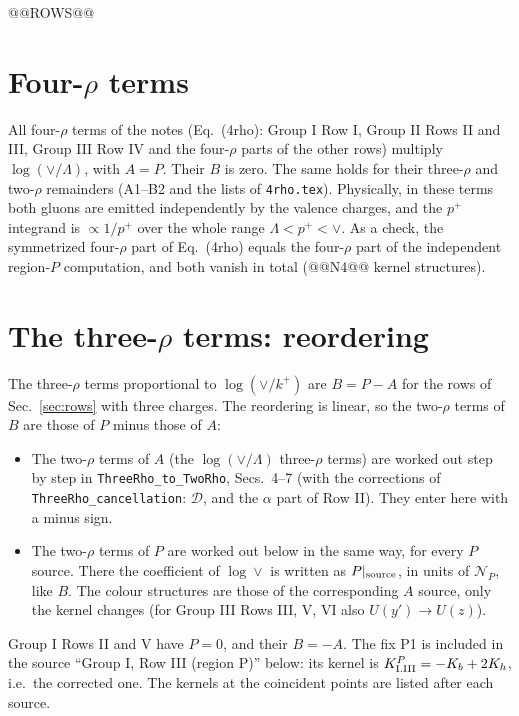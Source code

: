 \documentclass[10pt]{article}
\numberwithin{equation}{section}
\newcommand{\NP}{\mathcal N_{P}}
\newcommand{\pp}{p^+}
\begin{document}
@@ROWS@@

\section{Four-\texorpdfstring{$\rho$}{rho} terms}\label{sec:four}
All four-$\rho$ terms of the notes (Eq.~(4rho): Group I Row I, Group II Rows II and III, Group III Row IV and the four-$\rho$ parts of the other rows) multiply $\log(\vee/\Lambda)$, with $A=P$. Their $B$ is zero. The same holds for their three-$\rho$ and two-$\rho$ remainders (A1--B2 and the lists of \texttt{4rho.tex}). Physically, in these terms both gluons are emitted independently by the valence charges, and the $\pp$ integrand is $\propto1/\pp$ over the whole range $\Lambda<\pp<\vee$. As a check, the symmetrized four-$\rho$ part of Eq.~(4rho) equals the four-$\rho$ part of the independent region-$P$ computation, and both vanish in total (@@N4@@ kernel structures).

\section{The three-\texorpdfstring{$\rho$}{rho} terms: reordering}\label{sec:reorder}
The three-$\rho$ terms proportional to $\log(\vee/k^+)$ are $B=P-A$ for the rows of Sec.~\ref{sec:rows} with three charges. The reordering is linear, so the two-$\rho$ terms of $B$ are those of $P$ minus those of $A$:
\begin{itemize}
\item The two-$\rho$ terms of $A$ (the $\log(\vee/\Lambda)$ three-$\rho$ terms) are worked out step by step in \texttt{ThreeRho\_to\_TwoRho}, Secs.~4--7 (with the corrections of \texttt{ThreeRho\_cancellation}: $\mathcal D$, and the $\alpha$ part of Row II). They enter here with a minus sign.
\item The two-$\rho$ terms of $P$ are worked out below in the same way, for every $P$ source. There the coefficient of $\log\vee$ is written as $P|_{\rm source}$, in units of $\NP$, like $B$. The colour structures are those of the corresponding $A$ source, only the kernel changes (for Group III Rows III, V, VI also $U(y')\to U(z)$).
\end{itemize}
Group I Rows II and V have $P=0$, and their $B=-A$. The fix P1 is included in the source ``Group I, Row III (region P)'' below: its kernel is $K^{P}_{\rm I.III}=-K_b+2K_h$, i.e.\ the corrected one. The kernels at the coincident points are listed after each source.
\end{document}

